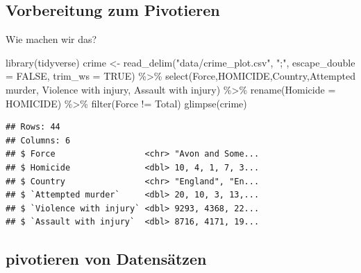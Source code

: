 \documentclass[
]{book}
\newenvironment{Shaded}{\begin{snugshade}}{\end{snugshade}}
\newcommand{\AttributeTok}[1]{\textcolor[rgb]{0.77,0.63,0.00}{#1}}
\newcommand{\ConstantTok}[1]{\textcolor[rgb]{0.00,0.00,0.00}{#1}}
\newcommand{\FunctionTok}[1]{\textcolor[rgb]{0.00,0.00,0.00}{#1}}
\newcommand{\NormalTok}[1]{#1}
\newcommand{\OtherTok}[1]{\textcolor[rgb]{0.56,0.35,0.01}{#1}}
\newcommand{\SpecialCharTok}[1]{\textcolor[rgb]{0.00,0.00,0.00}{#1}}
\newcommand{\StringTok}[1]{\textcolor[rgb]{0.31,0.60,0.02}{#1}}
\begin{document}
\hypertarget{vorbereitung-zum-pivotieren-1}{%
\subsection{Vorbereitung zum Pivotieren}\label{vorbereitung-zum-pivotieren-1}}

Wie machen wir das?

\begin{Shaded}
\begin{Highlighting}[]
\FunctionTok{library}\NormalTok{(tidyverse)}
\NormalTok{crime }\OtherTok{\textless{}{-}} \FunctionTok{read\_delim}\NormalTok{(}\StringTok{"data/crime\_plot.csv"}\NormalTok{, }
                    \StringTok{";"}\NormalTok{, }\AttributeTok{escape\_double =} \ConstantTok{FALSE}\NormalTok{, }\AttributeTok{trim\_ws =} \ConstantTok{TRUE}\NormalTok{) }\SpecialCharTok{\%\textgreater{}\%} 
  \FunctionTok{select}\NormalTok{(Force,HOMICIDE,Country,}\StringTok{\textasciigrave{}}\AttributeTok{Attempted murder}\StringTok{\textasciigrave{}}\NormalTok{, }
         \StringTok{\textasciigrave{}}\AttributeTok{Violence with injury}\StringTok{\textasciigrave{}}\NormalTok{, }\StringTok{\textasciigrave{}}\AttributeTok{Assault with injury}\StringTok{\textasciigrave{}}\NormalTok{) }\SpecialCharTok{\%\textgreater{}\%} 
  \FunctionTok{rename}\NormalTok{(}\StringTok{\textquotesingle{}Homicide\textquotesingle{}} \OtherTok{=} \StringTok{\textquotesingle{}HOMICIDE\textquotesingle{}}\NormalTok{) }\SpecialCharTok{\%\textgreater{}\%} 
  \FunctionTok{filter}\NormalTok{(Force }\SpecialCharTok{!=} \StringTok{\textquotesingle{}Total\textquotesingle{}}\NormalTok{)}
\FunctionTok{glimpse}\NormalTok{(crime)}
\end{Highlighting}
\end{Shaded}

\begin{verbatim}
## Rows: 44
## Columns: 6
## $ Force                  <chr> "Avon and Some...
## $ Homicide               <dbl> 10, 4, 1, 7, 3...
## $ Country                <chr> "England", "En...
## $ `Attempted murder`     <dbl> 20, 10, 3, 13,...
## $ `Violence with injury` <dbl> 9293, 4368, 22...
## $ `Assault with injury`  <dbl> 8716, 4171, 19...
\end{verbatim}

\hypertarget{pivotieren-von-datensuxe4tzen-1}{%
\subsection{pivotieren von Datensätzen}\label{pivotieren-von-datensuxe4tzen-1}}
\end{document}
